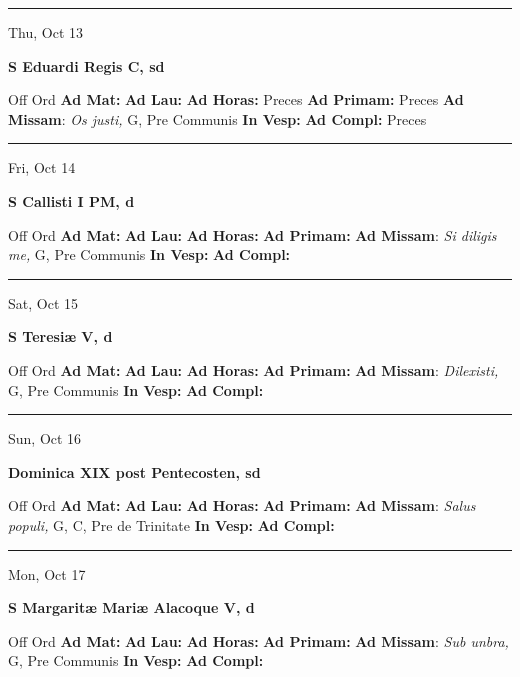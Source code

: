 \documentclass[letterpaper, 10pt]{article}
\begin{document}
\hrule
\begin{center}
Thu, Oct 13
\end{center}\textbf{ \large S Eduardi Regis C, \textnormal{\normalsize sd}}
\begin{justify}
Off Ord
\textbf{Ad Mat: }
\textbf{Ad Lau: }
\textbf{Ad Horas: }Preces
\textbf{Ad Primam: }Preces
\textbf{Ad Missam}: \textit{Os justi,} G, Pre Communis
\textbf{In Vesp: }
\textbf{Ad Compl: }Preces\end{justify}



\hrule
\begin{center}
Fri, Oct 14
\end{center}\textbf{ \large S Callisti I PM, \textnormal{\normalsize d}}
\begin{justify}
Off Ord
\textbf{Ad Mat: }
\textbf{Ad Lau: }
\textbf{Ad Horas: }
\textbf{Ad Primam: }
\textbf{Ad Missam}: \textit{Si diligis me,} G, Pre Communis
\textbf{In Vesp: }
\textbf{Ad Compl: }\end{justify}



\hrule
\begin{center}
Sat, Oct 15
\end{center}\textbf{ \large S Teresiæ V, \textnormal{\normalsize d}}
\begin{justify}
Off Ord
\textbf{Ad Mat: }
\textbf{Ad Lau: }
\textbf{Ad Horas: }
\textbf{Ad Primam: }
\textbf{Ad Missam}: \textit{Dilexisti,} G, Pre Communis
\textbf{In Vesp: }
\textbf{Ad Compl: }\end{justify}



\hrule
\begin{center}
Sun, Oct 16
\end{center}\textbf{ \large Dominica XIX post Pentecosten, \textnormal{\normalsize sd}}
\begin{justify}
Off Ord
\textbf{Ad Mat: }
\textbf{Ad Lau: }
\textbf{Ad Horas: }
\textbf{Ad Primam: }
\textbf{Ad Missam}: \textit{Salus populi,} G, C, Pre de Trinitate
\textbf{In Vesp: }
\textbf{Ad Compl: }\end{justify}



\hrule
\begin{center}
Mon, Oct 17
\end{center}\textbf{ \large S Margaritæ Mariæ Alacoque V, \textnormal{\normalsize d}}
\begin{justify}
Off Ord
\textbf{Ad Mat: }
\textbf{Ad Lau: }
\textbf{Ad Horas: }
\textbf{Ad Primam: }
\textbf{Ad Missam}: \textit{Sub unbra,} G, Pre Communis
\textbf{In Vesp: }
\textbf{Ad Compl: }\end{justify}
\end{document}
